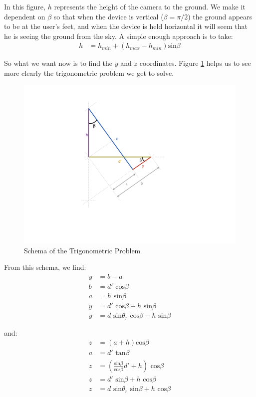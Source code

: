 In this figure, $h$ represents the height of the camera to the ground. We make it dependent on $\beta$ so that when the device is vertical ($\beta = \pi / 2$) the ground appears to be at the user's feet, and when the device is held horizontal it will seem that he is seeing the ground from the sky. A simple enough approach is to take:
\begin{align}
h 	&= h_{min} + (h_{max} - h_{min})\textrm{sin}\beta
\end{align}

So what we want now is to find the $y$ and $z$ coordinates. Figure \ref{fig:trigonometry} helps us to see more clearly the trigonometric problem we get to solve.

\clearpage

\begin{figure}[ht]
\center
\includegraphics[scale=0.5]{pics/trigonometry}
\caption{Schema of the Trigonometric Problem}
\label{fig:trigonometry}
\end{figure}

From this schema, we find:
\begin{align} 
y 	&= 	b - a\\
b 	&= 	d'\textrm{ cos}\beta\\
a 	&= 	h\textrm{ sin}\beta\\
y 	&=	d'\textrm{ cos}\beta - h\textrm{ sin}\beta\\
y 	&= 	d\textrm{ sin}\theta_r\textrm{ cos}\beta - h\textrm{ sin}\beta
\end{align}

and:
\begin{align} 
z 	&= 	 (a + h) \textrm{cos}\beta\\
a 	&= 	d' \textrm{ tan}\beta\\
z 	&= 	(\frac{\textrm{sin}\beta}{\textrm{cos}\beta} d' + h) \textrm{ cos}\beta\\
z 	&=	d'\textrm{ sin}\beta + h\textrm{ cos}\beta\\
z 	&= 	d\textrm{ sin}\theta_r\textrm{ sin}\beta + h\textrm{ cos}\beta
\end{align}

